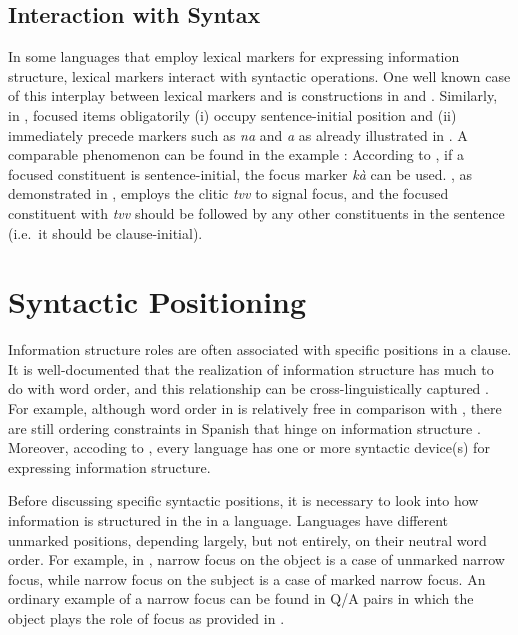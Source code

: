 \subsection{Interaction with Syntax}
\label{4:ssec:interaction-syn}



In some languages that employ lexical markers for expressing
information structure, lexical markers interact
with syntactic operations.  One well known case of this interplay
between lexical markers and  is
 constructions in  and 
\citep{choi:99,ishihara:01}. Similarly, in , focused items
obligatorily (i) occupy sentence-initial position and (ii) immediately
precede  markers such as \textit{na} and \textit{a} as already
illustrated in  \citep[p.\ 4]{drubig:03}.  A comparable
phenomenon can be found in the  example :
According to \citet{fery:krifka:08}, if a focused constituent is
sentence-initial, the focus marker \textit{k\`{a}} can be
used. , as demonstrated in , employs the
clitic \textit{tvv} to signal focus, and the focused constituent with
\textit{tvv} should be followed by any other constituents in the
sentence (i.e.\ it should be clause-initial).



\section{Syntactic Positioning}
\label{4:sec:syntactic}



Information structure roles are often associated with specific
positions in a clause. It is well-documented that the realization of
information structure has much to do with word order, and this
relationship can be cross-linguistically captured \citep[among many
  others]{zubizarreta:98,van:05,mereu:09}.  For example, although word
order in  is relatively free in comparison with
, there are still ordering constraints in Spanish that
hinge on information structure \citep{zagona:02}.  Moreover, accoding
to \citet{li:thompson:76}, every language has one or more syntactic
device(s) for expressing information structure.



Before discussing specific syntactic positions, it is necessary to
look into how information is structured in the 
in a language. Languages have different
unmarked  positions, depending largely, but not entirely, on
their neutral word order. For example, in , narrow focus on the
object is a case of unmarked narrow focus, while narrow focus on the
subject is a case of marked narrow focus.  An ordinary example of a
narrow focus can be found in Q/A pairs in which the object plays the
role of focus as provided in .



